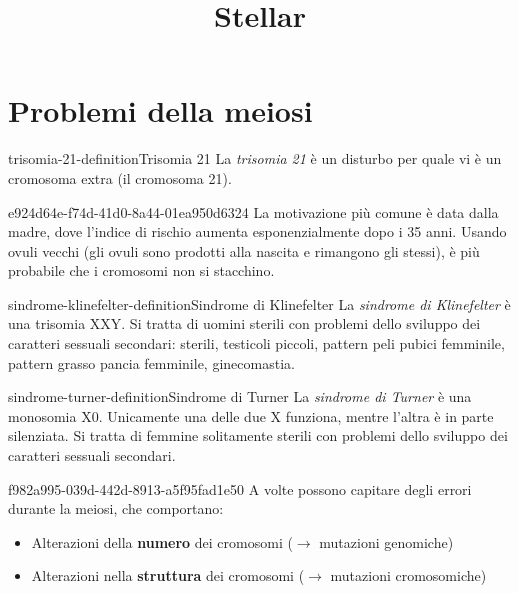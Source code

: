 \documentclass[preview]{standalone}
\begin{document}
\title{Stellar}
\genpage

\section{Problemi della meiosi}

\begin{snippetdefinition}{trisomia-21-definition}{Trisomia 21}
    La \textit{trisomia 21} è un disturbo per quale vi è un cromosoma extra (il cromosoma 21).
\end{snippetdefinition}


\begin{snippet}{e924d64e-f74d-41d0-8a44-01ea950d6324}
    La motivazione più comune è data dalla madre, dove l'indice di rischio aumenta
    esponenzialmente dopo i 35 anni.
    Usando ovuli vecchi (gli ovuli sono prodotti alla nascita e rimangono gli stessi),
    è più probabile che i cromosomi non si stacchino.
\end{snippet}


\begin{snippetdefinition}{sindrome-klinefelter-definition}{Sindrome di Klinefelter}
    La \textit{sindrome di Klinefelter}
    è una trisomia XXY. Si tratta di uomini sterili con problemi dello sviluppo
    dei caratteri sessuali secondari:
    sterili, testicoli piccoli, pattern peli pubici femminile,
    pattern grasso pancia femminile, ginecomastia.
\end{snippetdefinition}

\begin{snippetdefinition}{sindrome-turner-definition}{Sindrome di Turner}
    La \textit{sindrome di Turner} è
    una monosomia X0. Unicamente una delle due X funziona,
    mentre l'altra è in parte silenziata. Si tratta di femmine
    solitamente sterili con problemi dello sviluppo dei caratteri sessuali secondari.
\end{snippetdefinition}

\begin{snippet}{f982a995-039d-442d-8913-a5f95fad1e50}
    A volte possono capitare degli errori durante la meiosi, che comportano:
    \begin{itemize}
        \item Alterazioni della \textbf{numero} dei cromosomi (\(\rightarrow\) mutazioni genomiche)
        \item Alterazioni nella \textbf{struttura} dei cromosomi (\(\rightarrow\) mutazioni cromosomiche)
    \end{itemize}
\end{snippet}
\end{document}
